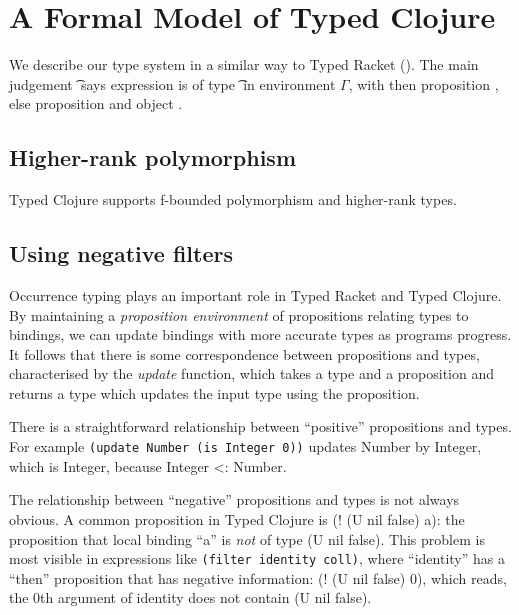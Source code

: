 \documentclass[preprint,10pt]{sigplanconf}
\begin{document}

\section{A Formal Model of Typed Clojure}

We describe our type system in a similar way to Typed Racket (\citet{TF10}).
The main judgement 
{\judgement {\Gamma} {\hastype {\e{}} {\t{}}} 
  {\filterset {\thenprop {\prop{}}}
              {\elseprop {\prop{}}}}
            {\object{}}}
says expression \e{} is of type \t{} in environment $\Gamma$, with 
then proposition {\thenprop {\prop{}}}, else proposition {\elseprop {\prop{}}}
and object \object{}.


\subsection{Higher-rank polymorphism}

Typed Clojure supports f-bounded polymorphism and higher-rank
types.

\subsection{Using negative filters}

Occurrence typing plays an important role in Typed Racket and Typed Clojure.
By maintaining a \emph{proposition environment} of propositions relating types to
bindings, we can update bindings with more accurate types as programs progress.
It follows that there is some correspondence between propositions and types,
characterised by the \emph{update} function, which takes a type and a proposition
and returns a type which updates the input type using the proposition.

There is a straightforward relationship between ``positive'' propositions and types.
For example 
{\tt (update Number (is Integer 0))}
updates Number by Integer, which is Integer, because Integer <: Number.

The relationship between ``negative'' propositions and types is not always obvious.
A common proposition in Typed Clojure is (! (U nil false) a): the proposition that
local binding ``a'' is \emph{not} of type (U nil false).
This problem is most visible in expressions like {\tt (filter identity coll)}, where
``identity'' has a ``then'' proposition that has negative information: (! (U nil false) 0),
which reads, the 0th argument of identity does not contain (U nil false).
\end{document}
